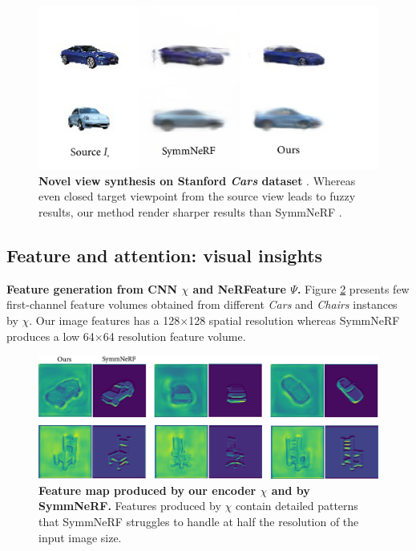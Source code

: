 \begin{figure}[h!]
    \begin{center}
  \includegraphics[width=\linewidth]{images/epinerf/supp_CarsStandford.png}
  \caption{\textbf{Novel view synthesis on Stanford \textit{Cars} dataset} \cite{krause20133d}. Whereas even closed target viewpoint from the source view leads to fuzzy results, our method render sharper results than SymmNeRF \cite{li2022symmnerf}. }
  \label{fig:res_Stanfordcar}
  \end{center}
\end{figure}

\subsection{Feature and attention: visual insights}
\label{subsec:visual_insights}

\noindent \textbf{Feature generation from CNN $\chi$ and NeRFeature $\Psi$.} Figure \ref{fig:feature_illustration} presents few first-channel feature volumes obtained from different \textit{Cars} and \textit{Chairs} instances by $\chi$.  Our image features has a 128$\times$128 spatial resolution whereas SymmNeRF produces a low  64$\times$64 resolution feature volume. 

\begin{figure}[h!]
\begin{center}
\includegraphics[width=\linewidth]{images/epinerf/feature_supp.png}
   \caption{\textbf{Feature map produced by our encoder $\chi$ and by SymmNeRF.} Features produced by $\chi$ contain detailed patterns that SymmNeRF struggles to handle at half the resolution of the input image size.}
\label{fig:feature_illustration}
\end{center}
\end{figure} 

